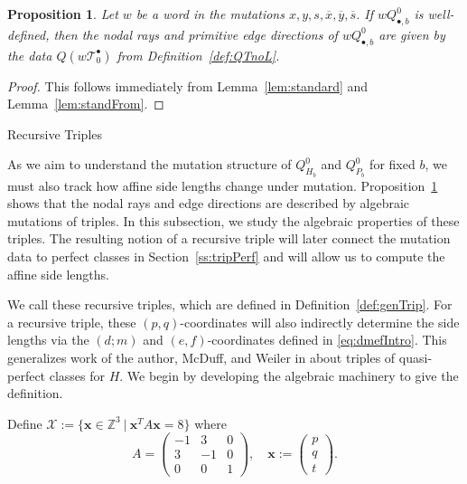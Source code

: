 \documentclass[11pt, reqno]{amsart}
\makeatletter
\def\subsection{\@startsection{subsection}{2}%
  \z@{.5\linespacing\@plus.7\linespacing}{-.5em}%
  {\normalfont\large\bfseries}}
\newtheorem{prop}[thm]{Proposition}
\theoremstyle{remark}
\numberwithin{equation}{subsection}
\numberwithin{figure}{section}
\theoremstyle{customremark}
\newcommand{\Tt}{\mathcal{T}}
\newcommand{\ov}{\overline}
\newcommand{\Z}{\mathbb{Z}}
\makeatother
\begin{document}
\begin{prop} \label{prop:nodalDir}
    Let $w$ be a word in the mutations $x,y,s,\ov{x},\ov{y},\ov{s}$. If $wQ_{\bullet,b}^0$ is well-defined, then the nodal rays and primitive edge directions of $wQ_{\bullet,b}^0$ are given by the data $Q(w\Tt_0^\bullet)$ from Definition~\ref{def:QTnoL}.
\end{prop}
\begin{proof}
    This follows immediately from Lemma~\ref{lem:standard} and Lemma~\ref{lem:standFrom}. 
\end{proof}



\subsection{Recursive Triples}\label{ss:trip}

As we aim to understand the mutation structure of $Q_{H_b}^0$ and $Q_{P_b}^0$ for fixed $b$, we must also track how affine side lengths change under mutation. Proposition~\ref{prop:nodalDir} shows that the nodal rays and edge directions are described by algebraic mutations of triples. In this subsection, we study the algebraic properties of these triples. The resulting notion of a recursive triple will later connect the mutation data to perfect classes in Section~\ref{ss:tripPerf} and will allow us to compute the affine side lengths. 


We call these recursive triples, which are defined in Definition~\ref{def:genTrip}. For a recursive triple, these $(p,q)$-coordinates will also indirectly determine the side lengths via the $(d;m)$ and $(e,f)$-coordinates defined in \eqref{eq:dmefIntro}. This generalizes work of the author, McDuff, and Weiler in \cite{MMW,MM} about triples of quasi-perfect classes for $H$. We begin by developing the algebraic machinery to give the definition. 


Define $\mathcal{X}:=\{ \bm{x} \in \Z^3 \ | \ \bm{x}^TA\bm{x}=8\}$ where \begin{equation} \label{eq:Xdef} A=\begin{pmatrix}
    -1 & 3 & 0 \\ 
    3 & -1 & 0 \\
    0 & 0 & 1
\end{pmatrix}, \quad \bm{x}:=\begin{pmatrix}
    p \\ q \\ t
\end{pmatrix}. \end{equation}
\end{document}

